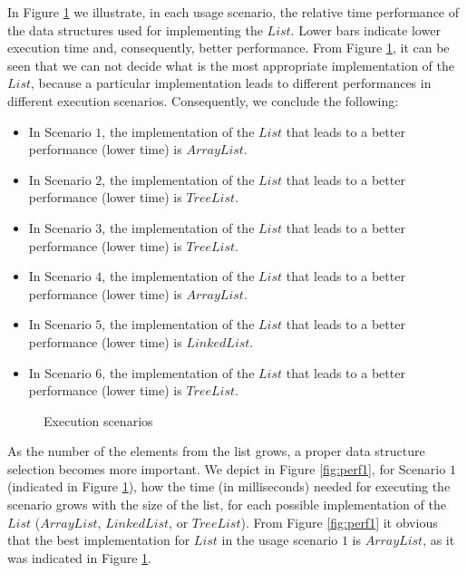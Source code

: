 In Figure \ref{fig:scen1} we illustrate, in each usage scenario, the relative time  performance of the data structures used for implementing the $List$. Lower bars indicate lower execution time and, consequently, better performance. From Figure \ref{fig:scen1}, it can be seen that we can not decide what is the most appropriate implementation of the $List$, because a particular implementation leads to different performances in different execution scenarios. Consequently, we conclude the following:

\begin{itemize}

\item In Scenario $1$, the implementation of the $List$ that leads to a better performance (lower time) is $ArrayList$.

\item In Scenario $2$, the implementation of the $List$ that leads to a better performance (lower time) is $TreeList$.

\item In Scenario $3$, the implementation of the $List$ that leads to a better performance (lower time) is $TreeList$.

\item In Scenario $4$, the implementation of the $List$ that leads to a better performance (lower time) is $ArrayList$.

\item In Scenario $5$, the implementation of the $List$ that leads to a better performance (lower time) is $LinkedList$.

\item In Scenario $6$, the implementation of the $List$ that leads to a better performance (lower time) is $TreeList$.


\end{itemize}


\begin{figure}
\centerline{}
      \caption{Execution scenarios}
\label{fig:scen1}
\end{figure}


As the number of the elements from the list grows, a proper data structure selection becomes more important. We depict in Figure \ref{fig:perf1}, for Scenario $1$ (indicated in Figure \ref{fig:scen1}), how the time (in milliseconds) needed for executing the scenario grows with the size of the list, for each possible implementation of the $List$ ($ArrayList$, $LinkedList$, or $TreeList$). From Figure \ref{fig:perf1} it obvious that the best implementation for $List$  in the usage scenario $1$ is $ArrayList$, as it was indicated in Figure \ref{fig:scen1}.



